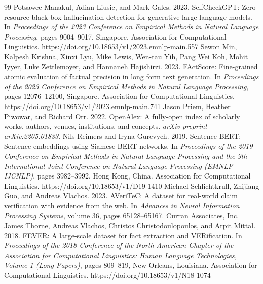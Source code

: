 \documentclass[11pt,a4paper]{article}
\begin{document}
\begin{thebibliography}{99}
Potsawee Manakul, Adian Liusie, and Mark Gales. 2023. SelfCheckGPT: Zero-resource black-box hallucination detection for generative large language models. In \textit{Proceedings of the 2023 Conference on Empirical Methods in Natural Language Processing}, pages 9004–9017, Singapore. Association for Computational Linguistics. https://doi.org/10.18653/v1/2023.emnlp-main.557
Sewon Min, Kalpesh Krishna, Xinxi Lyu, Mike Lewis, Wen-tau Yih, Pang Wei Koh, Mohit Iyyer, Luke Zettlemoyer, and Hannaneh Hajishirzi. 2023. FActScore: Fine-grained atomic evaluation of factual precision in long form text generation. In \textit{Proceedings of the 2023 Conference on Empirical Methods in Natural Language Processing}, pages 12076–12100, Singapore. Association for Computational Linguistics. https://doi.org/10.18653/v1/2023.emnlp-main.741
Jason Priem, Heather Piwowar, and Richard Orr. 2022. OpenAlex: A fully-open index of scholarly works, authors, venues, institutions, and concepts. \textit{arXiv preprint arXiv:2205.01833}.
Nils Reimers and Iryna Gurevych. 2019. Sentence-BERT: Sentence embeddings using Siamese BERT-networks. In \textit{Proceedings of the 2019 Conference on Empirical Methods in Natural Language Processing and the 9th International Joint Conference on Natural Language Processing (EMNLP-IJCNLP)}, pages 3982–3992, Hong Kong, China. Association for Computational Linguistics. https://doi.org/10.18653/v1/D19-1410
Michael Schlichtkrull, Zhijiang Guo, and Andreas Vlachos. 2023. AVeriTeC: A dataset for real-world claim verification with evidence from the web. In \textit{Advances in Neural Information Processing Systems}, volume 36, pages 65128–65167. Curran Associates, Inc.
James Thorne, Andreas Vlachos, Christos Christodoulopoulos, and Arpit Mittal. 2018. FEVER: A large-scale dataset for fact extraction and VERification. In \textit{Proceedings of the 2018 Conference of the North American Chapter of the Association for Computational Linguistics: Human Language Technologies, Volume 1 (Long Papers)}, pages 809–819, New Orleans, Louisiana. Association for Computational Linguistics. https://doi.org/10.18653/v1/N18-1074

\end{thebibliography}
\end{document}
